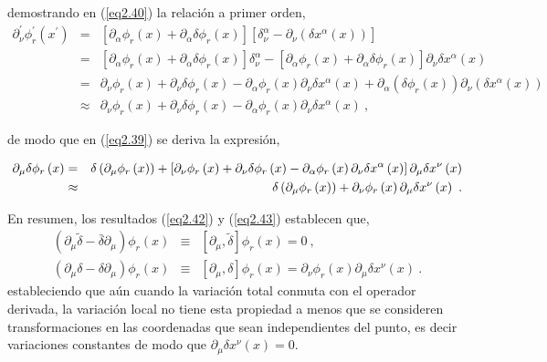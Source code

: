 \noindent
demostrando en (\ref{eq2.40}) la relación a primer orden,
\begin{eqnarray*}
\partial _{\nu }^{\prime }\phi _{r}^{\prime }\left( x^{\prime }\right)  &=& \left[ \partial _{\alpha }\phi _{r}\left( x\right) +\partial _{\alpha }\delta \phi _{r}\left( x\right) \right] \left[ \delta _{\nu }^{\alpha}-\partial _{\nu }\left( \delta x^{\alpha }\left( x\right) \right) \right] \\
&=&\left[ \partial _{\alpha }\phi _{r}\left( x\right) +\partial _{\alpha}\delta \phi _{r}\left( x\right) \right] \delta _{\nu }^{\alpha }-\left[ \partial _{\alpha }\phi _{r}\left( x\right) +\partial _{\alpha }\delta \phi_{r}\left( x\right) \right] \partial _{\nu }\delta x^{\alpha }\left(x\right)  \\
&=&\partial _{\nu }\phi _{r}\left( x\right) +\partial _{\nu }\delta \phi_{r}\left( x\right) -\partial _{\alpha }\phi _{r}\left( x\right) \partial_{\nu }\delta x^{\alpha }\left( x\right) +\partial _{\alpha }\left( \delta \phi _{r}\left( x\right) \right) \partial _{\nu }\left( \delta x^{\alpha }\left( x\right) \right)  \\
&\approx &\partial _{\nu }\phi _{r}\left( x\right) +\partial _{\nu }\delta \phi _{r}\left( x\right) -\partial _{\alpha }\phi _{r}\left( x\right) \partial _{\nu }\delta x^{\alpha }\left( x\right) ~, 
\end{eqnarray*}

\noindent
de modo que en (\ref{eq2.39}) se deriva la expresión,

\begin{eqnarray}
\partial _{\mu }\delta \phi _{r}\left( x\right)  &=&\delta \left( \partial_{\mu }\phi _{r}\left( x\right) \right) +\left[ \partial _{\nu }\phi_{r}\left( x\right) +\partial _{\nu }\delta \phi _{r}\left( x\right)-\partial _{\alpha }\phi _{r}\left(x\right) \partial _{\nu }\delta x^{\alpha }\left( x\right) \right] \partial _{\mu }\delta x^{\nu }\left(x\right)   \notag \\
&\approx &~\delta \left( \partial _{\mu }\phi _{r}\left( x\right) \right)+\partial _{\nu }\phi _{r}\left( x\right) \partial _{\mu }\delta x^{\nu}\left( x\right) ~.
\label{eq2.43}
\end{eqnarray}

\noindent
En resumen, los resultados (\ref{eq2.42}) y (\ref{eq2.43}) establecen que,
\begin{eqnarray*}
\left( \partial _{\mu }\tilde{\delta}-\bar{\delta}\partial _{\mu }\right) \phi_{r}\left( x\right)  &\equiv &\left[ \partial _{\mu },\tilde{\delta}\right] \phi _{r}\left( x\right) =0~, \\
\left( \partial _{\mu }\delta -\delta \partial _{\mu }\right) \phi_{r}\left( x\right)  &\equiv &\left[ \partial _{\mu },\delta \right] \phi_{r}\left( x\right) =\partial _{\nu }\phi _{r}\left( x\right) \partial _{\mu}\delta x^{\nu }\left( x\right) ~.
\end{eqnarray*}
estableciendo que aún cuando la variación total conmuta con el operador derivada, la variación local no tiene esta propiedad a menos que se consideren transformaciones en las coordenadas que sean independientes del punto, es decir variaciones constantes de modo que $\partial_{\mu} \delta x^{\nu }\left( x\right)=0$.\\

